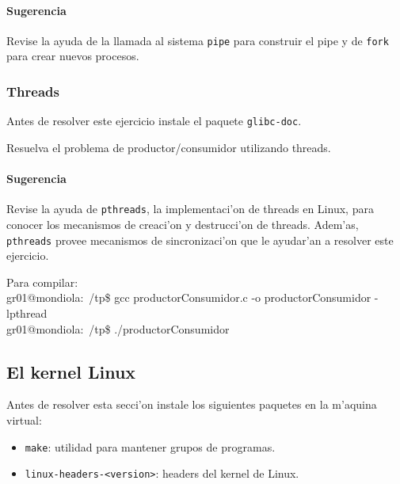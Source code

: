\paragraph{Sugerencia}

Revise la ayuda de la llamada al sistema \texttt{pipe} para construir el pipe y de \texttt{fork} para crear
nuevos procesos.


\subsubsection{Threads}

Antes de resolver este ejercicio instale el paquete \texttt{glibc-doc}.

Resuelva el problema de productor/consumidor utilizando threads.

\paragraph{Sugerencia}

Revise la ayuda de \texttt{pthreads}, la implementaci'on de threads en Linux, para conocer los mecanismos de creaci'on y
destrucci'on de threads. Adem'as, \texttt{pthreads} provee mecanismos de sincronizaci'on que le ayudar'an a resolver este
ejercicio.



\begin{envRespuesta}
Para compilar: \\
gr01@mondiola:~/tp\$ gcc productorConsumidor.c -o productorConsumidor -lpthread
\\
gr01@mondiola:~/tp\$ ./productorConsumidor
\end{envRespuesta}

\subsection{El kernel Linux}

Antes de resolver esta secci'on instale los siguientes paquetes en la m'aquina
virtual:

\begin{itemize}
\item \texttt{make}: utilidad para mantener grupos de programas.
\item \texttt{linux-headers-<version>}: headers del kernel de Linux.
\end{itemize}

